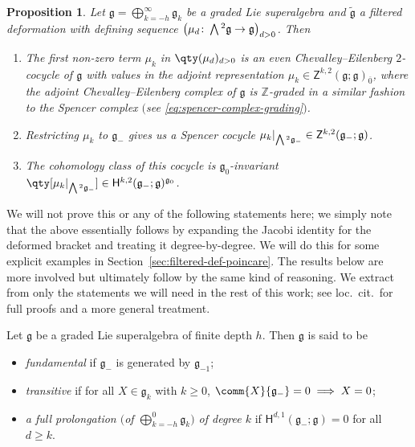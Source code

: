 \documentclass[pdftex]{sigma}
\numberwithin{equation}{section}
\newtheorem{Proposition}[Theorem]{Proposition}
 { \theoremstyle{definition}
\newtheorem{Definition}[Theorem]{Definition}
\newtheorem{Note}[Theorem]{Note}
\newtheorem{Example}[Theorem]{Example}
\newtheorem{Remark}[Theorem]{Remark} }
\newcommand{\fg}{\mathfrak{g}}
\newcommand{\ZZ}{\mathbb{Z}}
\newcommand{\ssH}{\mathsf{H}}
\newcommand{\ssZ}{\mathsf{Z}}
\newcommand{\fgtilde}{\widetilde{\mathfrak{g}}}
\newcommand{\Wedge}{\mathchoice{{\textstyle\bigwedge}}{\bigwedge}{\bigwedge}{\bigwedge}}	%
\newcommand{\1}{\mathbbm{1}}
\begin{document}

\begin{Proposition}\label{prop:def-seq-spencer-cocycle}
	Let $\fg=\bigoplus_{k=-h}^\infty\fg_k$ be a graded Lie superalgebra and $\fgtilde$ a filtered deformation with defining sequence $\bigl(\mu_d\colon\Wedge^2\fg\to\fg\bigr)_{d> 0}$. Then
	\begin{enumerate}\itemsep=0pt
		\item[$(1)$] {\rm\cite[\emph{Proposition}~2.1]{Cheng1998}} The first non-zero term $\mu_k$ in $\qty(\mu_d)_{d> 0}$ is an even Chevalley--Eilenberg $2$-cocycle of $\fg$ with values in the adjoint representation
		$\mu_k\in\ssZ^{k,2}(\fg;\fg)_{\overline{0}}$,	
		where the adjoint Chevalley--Eilenberg complex of $\fg$ is $\ZZ$-graded in a similar fashion to the Spencer complex $($see \eqref{eq:spencer-complex-grading}$)$.
		\item[$(2)$] {\rm\cite[\emph{Proposition}~2.2]{Cheng1998}} Restricting $\mu_k$ to $\fg_-$ gives us a Spencer cocycle
		$\mu_k|_{\Wedge^2\fg_-}\in\ssZ^{k,2}(\fg_-;\fg)$.
		\item[$(3)$] {\rm\cite[\emph{Proposition}~2.2]{Cheng1998}} The cohomology class of this cocycle is $\fg_0$-invariant
			$\qty[\mu_k|_{\Wedge^2\fg_-}]\in \ssH^{k,2}(\fg_-;\fg)^{\fg_0}$.
	\end{enumerate}
\end{Proposition}
We will not prove this or any of the following statements here; we simply note that the above essentially follows by expanding the Jacobi identity for the deformed bracket and treating it degree-by-degree. We will do this for some explicit examples in Section~\ref{sec:filtered-def-poincare}. The results below are more involved but ultimately follow by the same kind of reasoning. We extract from \cite{Cheng1998} only the statements we will need in the rest of this work; see loc.\ cit.\ for full proofs and a more general treatment.

\begin{Definition}\label{def:fund-trans-prolong}
	Let $\fg$ be a graded Lie superalgebra of finite depth $h$. Then $\fg$ is said to be
	\begin{itemize}\itemsep=0pt
	\item \emph{fundamental} if $\fg_-$ is generated by $\fg_{-1}$;
	\item \emph{transitive} if for all $X\in\fg_k$ with $k\geq 0$, $\comm{X}{\fg_-}=0\implies X=0$;
	\item \emph{a full prolongation $\big($of $\bigoplus_{k=-h}^0\fg_k\big)$ of degree $k$} if $\ssH^{d,1}(\fg_-;\fg)=0$ for all $d\geq k$.
	\end{itemize}
\end{Definition}
\end{document}
